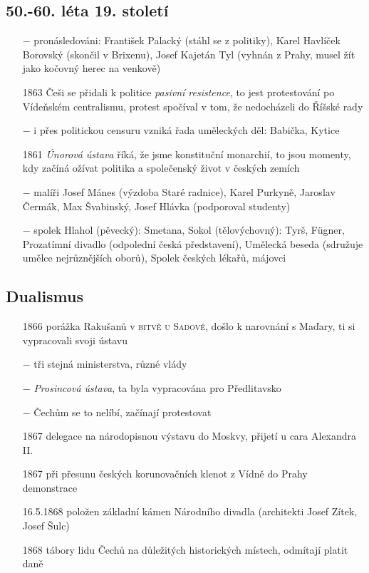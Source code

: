 \documentclass{article}
\begin{document}
\subsection*{50.-60. léta 19. století}
\begin{itemize}
    \vspace{-0.5em}
    \setlength\itemsep{0.15em}
    \item[$-$] pronásledováni: František Palacký (stáhl se z politiky), Karel Havlíček Borovský (skončil v Brixenu), Josef Kajetán Tyl (vyhnán z Prahy, musel žít jako kočovný herec na venkově)
    \item[1863] Češi se přidali k politice \textit{pasivní resistence}, to jest protestování po Vídeňském centralismu, protest spočíval v tom, že nedocházeli do Říšské rady
    \item[$-$] i přes politickou censuru vzniká řada uměleckých děl: Babička, Kytice
    \item[1861] \textit{Únorová ústava} říká, že jsme konstituční monarchií, to jsou momenty, kdy začíná ožívat politika a společenský život v českých zemích
    \item[$-$] malíři Josef Mánes (výzdoba Staré radnice), Karel Purkyně, Jaroslav Čermák, Max Švabinský, Josef Hlávka (podporoval studenty)
    \item[$-$] spolek Hlahol (pěvecký): Smetana, Sokol (tělovýchovný): Tyrš, Fügner, Prozatímní divadlo (odpolední česká představení), Umělecká beseda (sdružuje umělce nejrůznějších oborů), Spolek českých lékařů, májovci
\end{itemize}

\subsection*{Dualismus}
\begin{itemize}
    \vspace{-0.5em}
    \setlength\itemsep{0.15em}
    \item[1866] porážka Rakušanů v \textsc{bitvě u Sadové}, došlo k narovnání s Maďary, ti si vypracovali svoji ústavu
    \item[$-$] tři stejná ministerstva, různé vlády
    \item[$-$] \textit{Prosincová ústava}, ta byla vypracována pro Předlitavsko
    \item[$-$] Čechům se to nelíbí, začínají protestovat
    \item[1867] delegace na národopisnou výstavu do Moskvy, přijetí u cara Alexandra II.
    \item[1867] při přesunu českých korunovačních klenot z Vídně do Prahy demonstrace
    \item[16.5.1868] položen základní kámen Národního divadla (architekti Josef Zítek, Josef Šulc)
    \item[1868] tábory lidu Čechů na důležitých historických místech, odmítají platit daně
\end{itemize}
\end{document}
